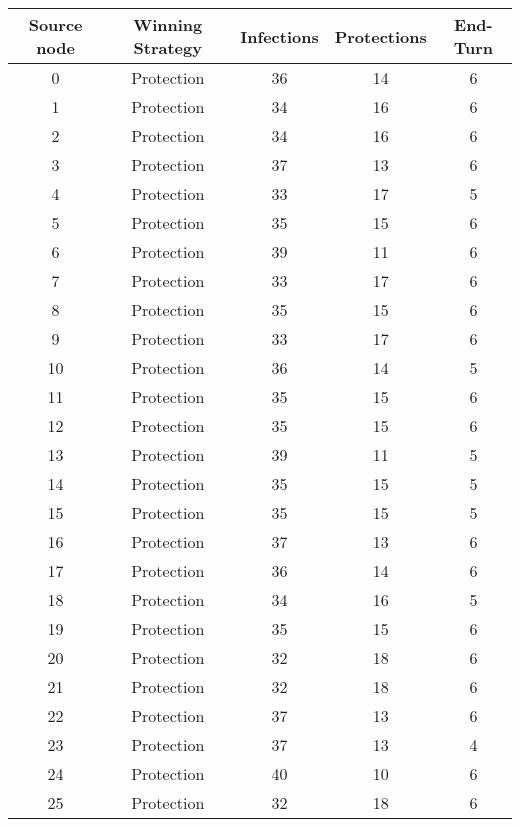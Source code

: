 \documentclass[results.tex]{subfiles}
\begin{document}
\begin{center}
  \begin{tabular}{| c || c | c | c | c |}
    \hline
    {\bfseries Source node} & {\bfseries Winning Strategy} & {\bfseries Infections} & {\bfseries Protections} & {\bfseries End-Turn} \\  %
    \hline\hline
    0 & Protection & 36 & 14 & 6 \\ 
    \hline
    1 & Protection & 34 & 16 & 6 \\ 
    \hline
    2 & Protection & 34 & 16 & 6 \\ 
    \hline
    3 & Protection & 37 & 13 & 6 \\ 
    \hline
    4 & Protection & 33 & 17 & 5 \\ 
    \hline
    5 & Protection & 35 & 15 & 6 \\ 
    \hline
    6 & Protection & 39 & 11 & 6 \\ 
    \hline
    7 & Protection & 33 & 17 & 6 \\ 
    \hline
    8 & Protection & 35 & 15 & 6 \\ 
    \hline
    9 & Protection & 33 & 17 & 6 \\ 
    \hline
    10 & Protection & 36 & 14 & 5 \\ 
    \hline
    11 & Protection & 35 & 15 & 6 \\ 
    \hline
    12 & Protection & 35 & 15 & 6 \\ 
    \hline
    13 & Protection & 39 & 11 & 5 \\ 
    \hline
    14 & Protection & 35 & 15 & 5 \\ 
    \hline
    15 & Protection & 35 & 15 & 5 \\ 
    \hline
    16 & Protection & 37 & 13 & 6 \\ 
    \hline
    17 & Protection & 36 & 14 & 6 \\ 
    \hline
    18 & Protection & 34 & 16 & 5 \\ 
    \hline
    19 & Protection & 35 & 15 & 6 \\ 
    \hline
    20 & Protection & 32 & 18 & 6 \\ 
    \hline
    21 & Protection & 32 & 18 & 6 \\ 
    \hline
    22 & Protection & 37 & 13 & 6 \\ 
    \hline
    23 & Protection & 37 & 13 & 4 \\ 
    \hline
    24 & Protection & 40 & 10 & 6 \\ 
    \hline
    25 & Protection & 32 & 18 & 6 \\ 

\end{tabular}
\end{center}
\end{document}
